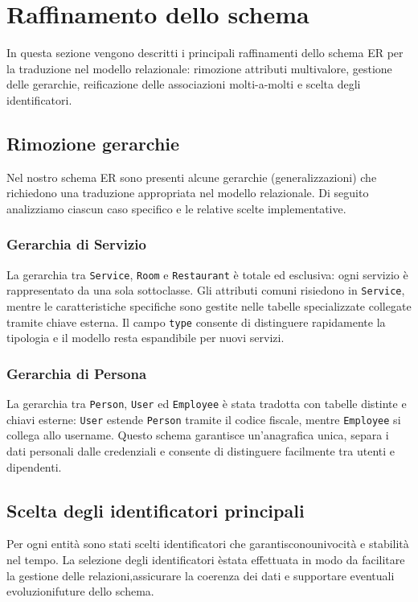 \documentclass[a4paper,12pt]{report}
\begin{document}
\newpage
\section{Raffinamento dello schema}
In questa sezione vengono descritti i principali raffinamenti dello
schema ER per la traduzione nel modello relazionale: rimozione
attributi multivalore, gestione delle gerarchie, reificazione delle
associazioni molti-a-molti e scelta degli identificatori.

\subsection{Rimozione gerarchie}
Nel nostro schema ER sono presenti alcune gerarchie
(generalizzazioni) che richiedono una traduzione appropriata nel
modello relazionale. Di seguito analizziamo ciascun caso specifico e
le relative scelte implementative.

\subsubsection{Gerarchia di Servizio}
La gerarchia tra \texttt{Service}, \texttt{Room} e
\texttt{Restaurant} è totale ed esclusiva: ogni servizio è
rappresentato da una sola sottoclasse. Gli attributi comuni risiedono
in \texttt{Service}, mentre le caratteristiche specifiche sono
gestite nelle tabelle specializzate collegate tramite chiave esterna.
Il campo \texttt{type} consente di distinguere rapidamente la
tipologia e il modello resta espandibile per nuovi servizi.

\subsubsection{Gerarchia di Persona}
La gerarchia tra \texttt{Person}, \texttt{User} ed \texttt{Employee}
è stata tradotta con tabelle distinte e chiavi esterne: \texttt{User}
estende \texttt{Person} tramite il codice fiscale, mentre
\texttt{Employee} si collega allo username. Questo schema garantisce
un'anagrafica unica, separa i dati personali dalle credenziali e
consente di distinguere facilmente tra utenti e dipendenti.

\subsection{Scelta degli identificatori principali}
Per ogni entità sono stati scelti identificatori che
garantisconounivocità e stabilità nel tempo. La selezione degli
identificatori èstata effettuata in modo da facilitare la gestione
delle relazioni,assicurare la coerenza dei dati e supportare
eventuali evoluzionifuture dello schema.
\end{document}
